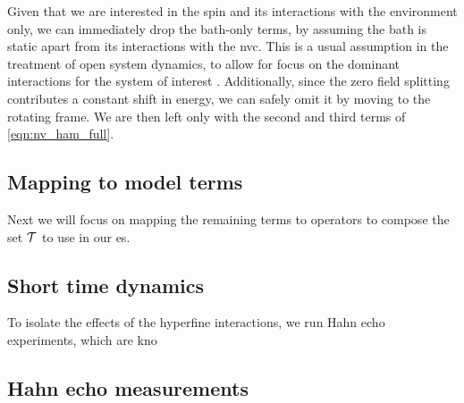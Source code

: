 
Given that we are interested in the spin and its interactions with the environment only, 
    we can immediately drop the bath-only terms, by assuming the bath is static 
    apart from its interactions with the \gls{nvc}. 
This is a usual assumption in the treatment of open system dynamics, 
    to allow for focus on the dominant interactions for the system of interest \cite{breuer2002theory}. 
Additionally, since the zero field splitting contributes a constant shift in energy, 
    we can safely omit it by moving to the rotating frame. 
We are then left only with the second and third terms of \cref{eqn:nv_ham_full}. 

\subsection{Mapping to model terms}
Next we will focus on mapping the remaining terms to operators to compose the set ${ \mathcal{T} }$ to use in our \gls{es}. 


\subsection{Short time dynamics}
To isolate the effects of the hyperfine interactions, 
    we run Hahn echo experiments, which are kno
\subsection{Hahn echo measurements}


\section{}



